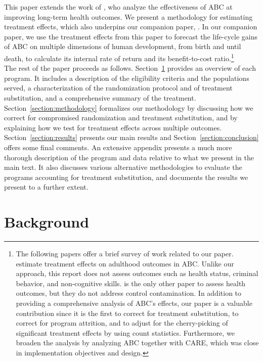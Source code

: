 \noindent This paper extends the work of \citet{Campbell_Conti_etal_2014_EarlyChildhoodInvestments}, who analyze the effectiveness of ABC at improving long-term health outcomes. We present a methodology for estimating treatment effects, which also underpins our companion paper, \citet{Elango_et_al_2015_ABC_unpublished}. In our companion paper, we use the treatment effects from this paper to forecast the life-cycle gains of ABC on multiple dimensions of human development, from birth and until death, to calculate its internal rate of return and its benefit-to-cost ratio.\footnote{The following papers offer a brief survey of work related to our paper. \cite{Campbell_Pungello_etal_2012_DP} estimate treatment effects on adulthood outcomes in ABC. Unlike our approach, this report does not assess outcomes such as health status, criminal behavior, and non-cognitive skills. \cite{Campbell_Conti_etal_2014_EarlyChildhoodInvestments} is the only other paper to assess health outcomes, but they do not address control contamination. In addition to providing a comprehensive analysis of ABC's effects, our paper is a valuable contribution since it is the first to correct for treatment substitution, to correct for program attrition, and to adjust for the cherry-picking of significant treatment effects by using count statistics. Furthermore, we broaden the analysis by analyzing ABC together with CARE, which was close in implementation objectives and design.}\\

\noindent The rest of the paper proceeds as follows. Section~\ref{section:background} provides an overview of each program. It includes a description of the eligibility criteria and the populations served, a characterization of the randomization protocol and of treatment substitution, and a comprehensive summary of the treatment. Section~\ref{section:methodology} formalizes our methodology by discussing how we correct for compromised randomization and treatment substitution, and  by explaining how we test for treatment effects across multiple outcomes. Section~\ref{section:results} presents our main results and Section~\ref{section:conclusion} offers some final comments. An extensive appendix presents a much more thorough description of the program and data relative to what we present in the main text. It also discusses various alternative methodologies to evaluate the programs accounting for treatment substitution, and documents the results we present to a further extent.

\section{Background} \label{section:background}
